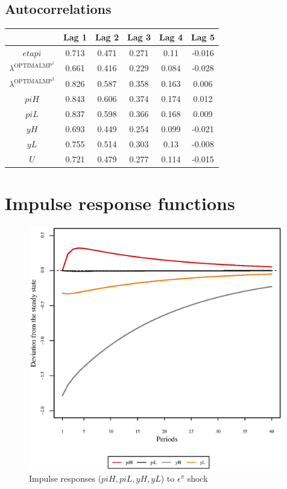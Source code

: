 \subsection{Autocorrelations}

\begin{tabular}{c|ccccc|}
  & Lag 1 & Lag 2 & Lag 3 & Lag 4 & Lag 5\\
\hline
${e\!t\!a\!p\!i}$ & 0.713 & 0.471 & 0.271 & 0.11 & -0.016 \\
$\lambda^{\mathrm{OPTIMALMP}^{\mathrm{1}}}$ & 0.661 & 0.416 & 0.229 & 0.084 & -0.028 \\
$\lambda^{\mathrm{OPTIMALMP}^{\mathrm{2}}}$ & 0.826 & 0.587 & 0.358 & 0.163 & 0.006 \\
${p\!i\!H}$ & 0.843 & 0.606 & 0.374 & 0.174 & 0.012 \\
${p\!i\!L}$ & 0.837 & 0.598 & 0.366 & 0.168 & 0.009 \\
${y\!H}$ & 0.693 & 0.449 & 0.254 & 0.099 & -0.021 \\
${y\!L}$ & 0.755 & 0.514 & 0.303 & 0.13 & -0.008 \\
$U$ & 0.721 & 0.479 & 0.277 & 0.114 & -0.015 \\
\hline
\end{tabular}



\pagebreak

\section{Impulse response functions}

\begin{figure}[h]
\centering
\begin{minipage}{0.5\textwidth}
\vspace*{-3em}
\centering
\includegraphics[width=0.99\textwidth, scale=0.55]{plots/plot_6.eps}
\caption{Impulse responses (${p\!i\!H}, {p\!i\!L}, {y\!H}, {y\!L}$) to $\epsilon^{\pi}$ shock}
\end{minipage}
\end{figure}
